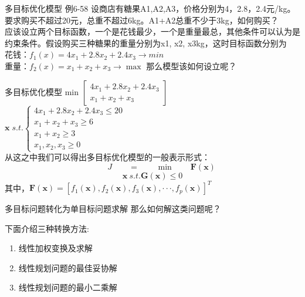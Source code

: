 \documentclass[10pt]{beamer}
\begin{document}
\begin{frame}[allowframebreaks]{多目标优化模型}
  例6-58  设商店有糖果A1,A2,A3，价格分别为4，2.8，2.4元/kg。要求购买不超过20元，总重不超过6kg。A1+A2总重不少于3kg，如何购买？
  \\应该设立两个目标函数，一个是花钱最少，一个是重量最总，其他条件可以认为是约束条件。假设购买三种糖果的重量分别为x1, x2, x3kg，这时目标函数分别为
  \\花钱：$f_1(x) = 4x_1+2.8x_2+2.4x_3 \rightarrow min$
  \\重量：$f_2(x) = x_1+x_2+x_3 \rightarrow \max$ 
  那么模型该如何设立呢？
  \end{frame}
  \begin{frame}[allowframebreaks]{多目标优化模型}
    \qquad min\qquad \qquad \qquad \qquad \qquad
    $
    \left[
    \begin{array}{ccc}
    4x_1+2.8x_2+2.4x_3	\\
    x_1+x_2+x_3	
    \end{array} 
    \right]
    $
    \\
    $
    \bm{x}\;s.t.
    \left\{
    \begin{array}{ccc}
    4x_1+2.8x_2+2.4x_3\leq20\\
    x_1+x_2+x_3\geq6\\
    x_1+x_2\geq3 \\
    x_1,x_2,x_3\geq0 
    \end{array} 
    \right.
    $
    \\从这之中我们可以得出多目标优化模型的一般表示形式：
    $$ \qquad \ J\qquad = \qquad \min\qquad \bm{F(x)}$$
    $$ \bm{x}\ s.t.  \bm{G(x)}\leq0$$
    其中，$\bm{F(x)} = [f_1(\bm{x}),f_2(\bm{x}),f_3(\bm{x}),\cdot \cdot \cdot,f_p(\bm{x})]^T$
  \end{frame}

\begin{frame}[allowframebreaks]{多目标问题转化为单目标问题求解}
  那么如何解这类问题呢？
  
  下面介绍三种转换方法:
  \begin{enumerate}
    \item 线性加权变换及求解
    \item 线性规划问题的最佳妥协解
    \item 线性规划问题的最小二乘解
  \end{enumerate}

\end{frame}
\end{document}
